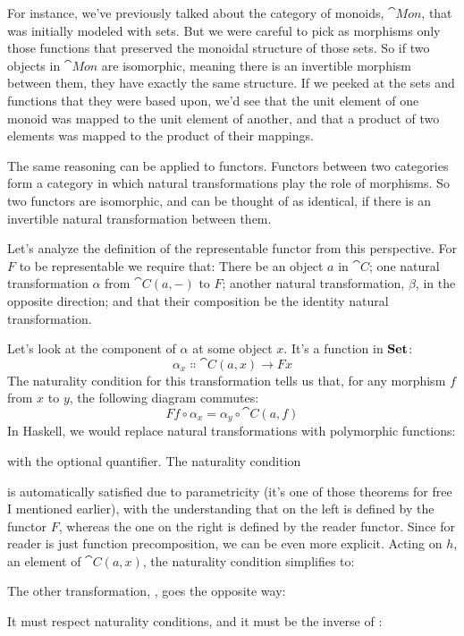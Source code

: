 For instance, we've previously talked about the category of monoids,
$\cat{Mon}$, that was initially modeled with sets. But we were careful
to pick as morphisms only those functions that preserved the monoidal
structure of those sets. So if two objects in $\cat{Mon}$ are
isomorphic, meaning there is an invertible morphism between them, they
have exactly the same structure. If we peeked at the sets and functions
that they were based upon, we'd see that the unit element of one monoid
was mapped to the unit element of another, and that a product of two
elements was mapped to the product of their mappings.

The same reasoning can be applied to functors. Functors between two
categories form a category in which natural transformations play the
role of morphisms. So two functors are isomorphic, and can be thought of
as identical, if there is an invertible natural transformation between
them.

Let's analyze the definition of the representable functor from this
perspective. For $F$ to be representable we require that: There
be an object $a$ in $\cat{C}$; one natural transformation $\alpha$ from
$\cat{C}(a, -)$ to $F$; another natural transformation, $\beta$, in
the opposite direction; and that their composition be the identity
natural transformation.

Let's look at the component of $\alpha$ at some object $x$. It's a
function in $\mathbf{Set}$:
\[\alpha_x \Colon \cat{C}(a, x) \to F x\]
The naturality condition for this transformation tells us that, for any
morphism $f$ from $x$ to $y$, the following diagram
commutes:
\[F f \circ \alpha_x = \alpha_y \circ \cat{C}(a, f)\]
In Haskell, we would replace natural transformations with polymorphic
functions:

with the optional  quantifier. The naturality condition

is automatically satisfied due to parametricity (it's one of those
theorems for free I mentioned earlier), with the understanding that
 on the left is defined by the functor $F$, whereas
the one on the right is defined by the reader functor. Since
 for reader is just function precomposition, we can be even
more explicit. Acting on $h$, an element of $\cat{C}(a, x)$,
the naturality condition simplifies to:

The other transformation, , goes the opposite way:

It must respect naturality conditions, and it must be the inverse of :

